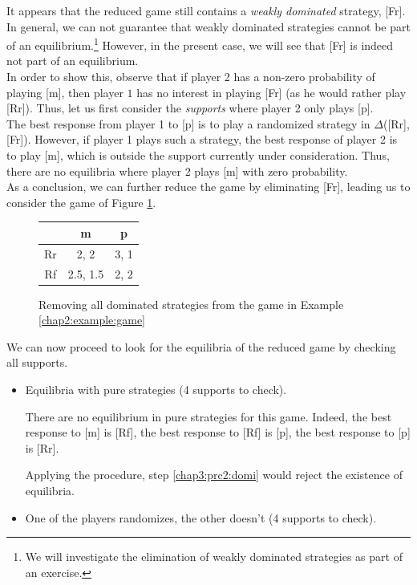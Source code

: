 \begin{example}
It appears that the reduced game still contains a \emph{weakly dominated} strategy, [Fr]. 
In general, we can not guarantee that weakly dominated strategies cannot be part of an equilibrium.\footnote{We will investigate the elimination of weakly dominated strategies as part of an exercise.}
However, in the present case, we will see that [Fr] is indeed not part of an equilibrium.\\
In order to show this, observe that if player 2 has a
 non-zero probability of playing [m],
  then player $1$ has no interest in playing [Fr] (as he would rather play [Rr]).
 Thus, let us first consider the \emph{supports} where player 2 only plays  [p].\\
 The best response from player 1 to [p] is to play a randomized strategy in $\Delta$([Rr], [Fr]). 
 However, if player 1 plays such a strategy,   the best response of player 2 is to play [m], 
  which is outside the support currently under consideration.
   Thus, there are no equilibria where player 2 plays [m] with zero probability.\\
   As a conclusion, we can further reduce the game by eliminating [Fr], leading us to consider the game of Figure \ref{chap3:tablefromchap2-reduced2}.
 


\begin{figure}[!ht]
\centering
\begin{tabular}{c|cc}
 & m & p \\
\hline
Rr & 2, 2 & 3, 1 \\
Rf & 2.5, 1.5 & 2, 2
\end{tabular}
\caption{Removing all dominated strategies from the game in Example \ref{chap2:example:game}}
\label{chap3:tablefromchap2-reduced2}
\end{figure}

We can now proceed to look for the equilibria of the reduced game by checking all supports.
\begin{itemize}
\item[\textbf{Case 1:}] Equilibria with pure strategies (4 supports to check).

There are no equilibrium in pure strategies for this game. Indeed, the best response to [m] is [Rf], the best response to [Rf] is [p], the best response to [p] is [Rr]. 

Applying the procedure, step \ref{chap3:prc2:domi} would reject the existence of equilibria.

\item[\textbf{Case 2:}] One of the players randomizes, the other doesn't (4 supports to check).


\end{itemize}
\end{example}
